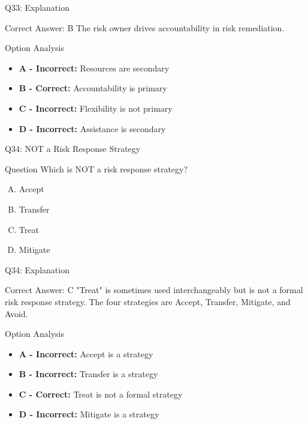 \documentclass{beamer}
\begin{document}
	\begin{frame}{Q33: Explanation}
		\begin{block}{Correct Answer: B}
			The risk owner drives accountability in risk remediation.
		\end{block}
		\begin{block}{Option Analysis}
			\begin{itemize}
				\item \textbf{A - Incorrect:} Resources are secondary
				\item \textbf{B - Correct:} Accountability is primary
				\item \textbf{C - Incorrect:} Flexibility is not primary
				\item \textbf{D - Incorrect:} Assistance is secondary
			\end{itemize}
		\end{block}
	\end{frame}
	
	\begin{frame}{Q34: NOT a Risk Response Strategy}
		\begin{block}{Question}
			Which is NOT a risk response strategy?
		\end{block}
		\begin{enumerate}[(A)]
			\item Accept
			\item Transfer
			\item Treat
			\item Mitigate
		\end{enumerate}
	\end{frame}
	
	\begin{frame}{Q34: Explanation}
		\begin{block}{Correct Answer: C}
			"Treat" is sometimes used interchangeably but is not a formal risk response strategy. The four strategies are Accept, Transfer, Mitigate, and Avoid.
		\end{block}
		\begin{block}{Option Analysis}
			\begin{itemize}
				\item \textbf{A - Incorrect:} Accept is a strategy
				\item \textbf{B - Incorrect:} Transfer is a strategy
				\item \textbf{C - Correct:} Treat is not a formal strategy
				\item \textbf{D - Incorrect:} Mitigate is a strategy
			\end{itemize}
		\end{block}
	\end{frame}
	
\end{document}
